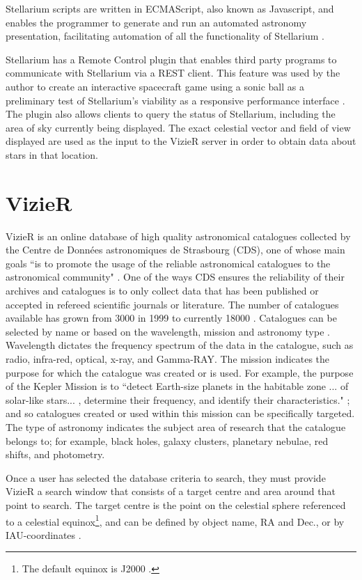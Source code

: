 \documentclass[10pt,a4paper,extrafontsizes]{memoir}
\begin{document}
Stellarium scripts are written in ECMAScript, also known as Javascript, and enables the programmer to generate and run an automated astronomy presentation, facilitating  automation of all the functionality of Stellarium  \cite{zottistellarium}. 

Stellarium has a Remote Control plugin that enables third party programs to communicate with Stellarium via a REST client. This feature was used by the author to create an interactive spacecraft game using a sonic ball as a preliminary test of Stellarium's viability as a responsive performance interface \cite{fraiettaLAC2019}. The plugin also allows clients to query the status of Stellarium, including the area of sky currently being displayed.  The exact celestial vector and field of view displayed are used as the input to the VizieR server in order to obtain data about stars in that location.

\section{VizieR}
VizieR is an online database of high quality astronomical catalogues collected by the Centre de Donn\'ees astronomiques de Strasbourg (CDS), one of whose main goals  ``is to promote the usage of the reliable astronomical catalogues to the astronomical community" \cite[p.~25]{ochsenbein2000vizier}. One of the ways CDS ensures the reliability of their archives and catalogues is to only collect data that has been published or accepted in refereed scientific journals or literature. The number of catalogues available has grown from 3000 in 1999  \cite[p.~24]{ochsenbein2000vizier} to currently 18000 \cite{VizierPage}. Catalogues can be selected by name or based on the wavelength, mission and astronomy type \cite{vizquery}.  Wavelength dictates the frequency spectrum of the data in the catalogue, such as radio, infra-red, optical, x-ray, and Gamma-RAY. The mission indicates the purpose for which the catalogue was created or is used. For example, the purpose of the Kepler Mission is to ``detect Earth-size planets in the habitable zone ... of solar-like stars... , determine their frequency, and identify their characteristics." \cite[p.~2]{koch2010kepler}; and so catalogues created or used within this mission can be specifically targeted. The type of astronomy indicates the subject area of research that the catalogue belongs to; for example,  black holes, galaxy clusters, planetary nebulae, red shifts, and photometry. 

Once a user has selected the database criteria to search, they must provide VizieR  a search window that consists of a target centre and area around that point to search. The target centre is the point on the celestial sphere referenced to a celestial equinox\footnote{The default equinox is J2000 \cite{vizquery}.}, and can be defined by object name,  RA and Dec., or by IAU-coordinates \cite{vizquerytarget}.
\end{document}
